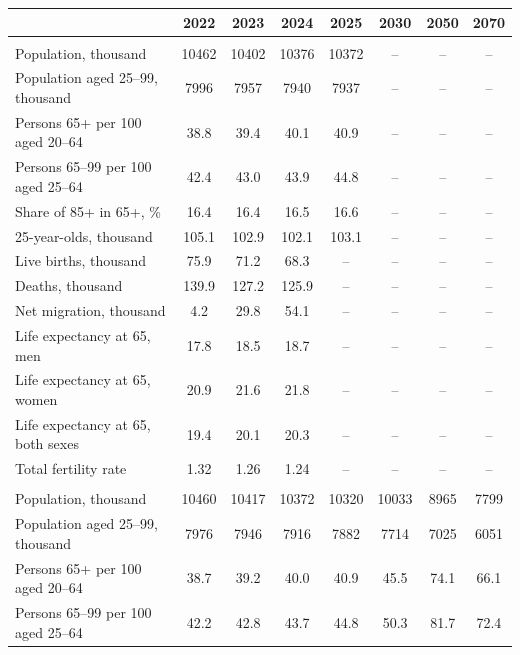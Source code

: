 \begin{tabular}{@{}lS[table-format=5.2]S[table-format=5.2]S[table-format=5.2]S[table-format=5.2]S[table-format=5.2]S[table-format=5.2]S[table-format=5.2]@{}}
\toprule
 & {2022} & {2023} & {2024} & {2025} & {2030} & {2050} & {2070} \\
\midrule
\addlinespace{}\\
Population, thousand & 10462 & 10402 & 10376 & 10372 & {--} & {--} & {--} \\
Population aged 25--99, thousand & 7996 & 7957 & 7940 & 7937 & {--} & {--} & {--} \\
Persons 65+ per 100 aged 20--64 & 38.8 & 39.4 & 40.1 & 40.9 & {--} & {--} & {--} \\
Persons 65--99 per 100 aged 25--64 & 42.4 & 43.0 & 43.9 & 44.8 & {--} & {--} & {--} \\
Share of 85+ in 65+, \% & 16.4 & 16.4 & 16.5 & 16.6 & {--} & {--} & {--} \\
25-year-olds, thousand & 105.1 & 102.9 & 102.1 & 103.1 & {--} & {--} & {--} \\
Live births, thousand & 75.9 & 71.2 & 68.3 & {--} & {--} & {--} & {--} \\
Deaths, thousand & 139.9 & 127.2 & 125.9 & {--} & {--} & {--} & {--} \\
Net migration, thousand & 4.2 & 29.8 & 54.1 & {--} & {--} & {--} & {--} \\
Life expectancy at 65, men & 17.8 & 18.5 & 18.7 & {--} & {--} & {--} & {--} \\
Life expectancy at 65, women & 20.9 & 21.6 & 21.8 & {--} & {--} & {--} & {--} \\
Life expectancy at 65, both sexes & 19.4 & 20.1 & 20.3 & {--} & {--} & {--} & {--} \\
Total fertility rate & 1.32 & 1.26 & 1.24 & {--} & {--} & {--} & {--} \\
\addlinespace{}\\
Population, thousand & 10460 & 10417 & 10372 & 10320 & 10033 & 8965 & 7799 \\
Population aged 25--99, thousand & 7976 & 7946 & 7916 & 7882 & 7714 & 7025 & 6051 \\
Persons 65+ per 100 aged 20--64 & 38.7 & 39.2 & 40.0 & 40.9 & 45.5 & 74.1 & 66.1 \\
Persons 65--99 per 100 aged 25--64 & 42.2 & 42.8 & 43.7 & 44.8 & 50.3 & 81.7 & 72.4 \\

\end{tabular}
